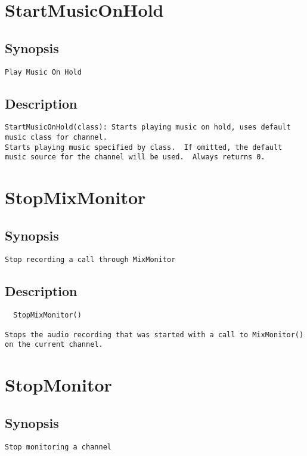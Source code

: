 \section{StartMusicOnHold}
\subsection{Synopsis}
\begin{verbatim}
Play Music On Hold
\end{verbatim}
\subsection{Description}
\begin{verbatim}
StartMusicOnHold(class): Starts playing music on hold, uses default music class for channel.
Starts playing music specified by class.  If omitted, the default
music source for the channel will be used.  Always returns 0.

\end{verbatim}


\section{StopMixMonitor}
\subsection{Synopsis}
\begin{verbatim}
Stop recording a call through MixMonitor
\end{verbatim}
\subsection{Description}
\begin{verbatim}
  StopMixMonitor()

Stops the audio recording that was started with a call to MixMonitor()
on the current channel.

\end{verbatim}


\section{StopMonitor}
\subsection{Synopsis}
\begin{verbatim}
Stop monitoring a channel
\end{verbatim}
